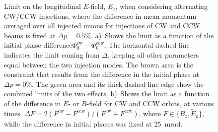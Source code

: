 \begin{refsection}
        \begin{figure}
            \centering
            \hfill
            \caption{ Limit on the longitudinal $E$-field, $E_z$, when considering alternating CW/CCW injections, where the difference in mean momentum averaged over all injected muons for injections of CW and CCW beams is fixed at $\Delta p = 0.5\%$. 
            a)~Shows the limit as a function of the initial phase difference$\Phi_0^\mathrm{cw} - \Phi_0^\mathrm{ccw}$. 
            The horizontal dashed line indicates the limit coming from $\Delta$, keeping all other parameters equal between the two injection modes. 
            The brown area is the constraint that results from the difference in the initial phase at $\Delta p = 0\%$. 
            The green area and its thick dashed line edge show the combined limits of the two effects. 
            b)~Shows the limit as a function of the difference in $E$- or $B$-field for CW and CCW orbits, at various times. $\Delta F = 2 (F^\mathrm{cw} - F^\mathrm{ccw})/(F^\mathrm{cw} + F^\mathrm{ccw})$, where $F \in \{B_z, \tilde E_\rho \}$, while the difference in initial phases was fixed at \SI{25}{mrad}.
            }
        \label{fig:muEDM:omz_ez_limit}
        \end{figure}


\end{refsection}

